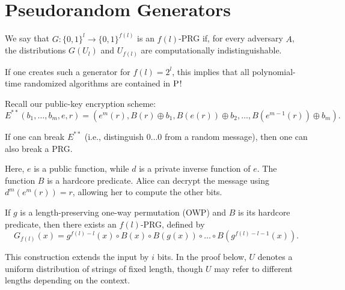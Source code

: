 \section{Pseudorandom Generators}

\begin{definition}
  We say that $G \colon \{0,1\}^l \to \{0,1\}^{f(l)}$ is an $f(l)$-PRG if, for every adversary $A$, the distributions $G(U_l)$ and $U_{f(l)}$ are computationally indistinguishable.
\end{definition}

If one creates such a generator for $f(l) = 2^{l}$, this implies that all polynomial-time randomized algorithms are contained in $\P$!

Recall our public-key encryption scheme:
\[
E^{**}(b_1, \ldots, b_m, e, r) = \left(e^{m}(r), B(r) \oplus b_1, B(e(r)) \oplus b_2, \ldots, B(e^{m - 1}(r)) \oplus b_m\right).
\] 

\begin{theorem}
  If one can break $E^{**}$ (i.e., distinguish $0\ldots0$ from a random message), then one can also break a PRG.
\end{theorem}

Here, $e$ is a public function, while $d$ is a private inverse function of $e$.
The function $B$ is a hardcore predicate.
Alice can decrypt the message using $d^{m}(e^{m}(r)) = r$, allowing her to compute the other bits.

\begin{lemma}
	If $g$ is a length-preserving one-way permutation (OWP) and $B$ is its hardcore predicate, then there exists an $f(l)$-PRG, defined by
	 \[
	  G_{f(l)}(x) = g^{f(l) - l}(x) \circ B(x) \circ B(g(x)) \circ \dots \circ B(g^{f(l) - l - 1}(x)).
	 \] 
\end{lemma}
This construction extends the input by $i$ bits.
In the proof below, $U$ denotes a uniform distribution of strings of fixed length, though $U$ may refer to different lengths depending on the context.

